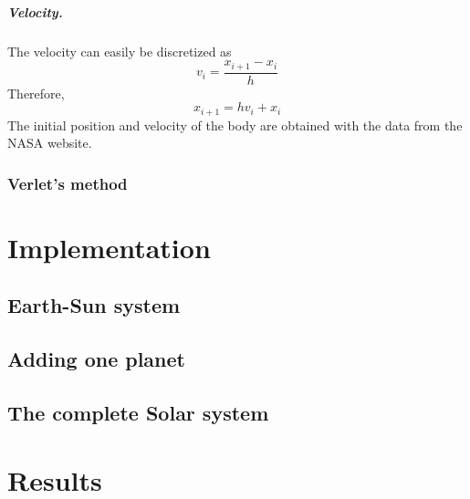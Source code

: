 \documentclass[a4paper, twoside, 11pt]{report}
\theoremstyle{theorem}
\theoremstyle{remark}
\theoremstyle{exemple}
\begin{document}
             \paragraph{Velocity.}The velocity can easily be discretized as
                \begin{equation*}
                      v_i = \frac{x_{i+1}-x_i}{h}
                  \end{equation*}
             Therefore,
                 \begin{equation*}
                    x_{i+1} = hv_i + x_i
                    \tag{9}
                \end{equation*}   
            The initial position and velocity of the body are obtained with the data from the NASA website.
        \subsection{Verlet's method}

\chapter{Implementation}

    \section{Earth-Sun system}
        \paragraph{}
    
    \section{Adding one planet}
    
    
    \section{The complete Solar system}
    
    

\chapter{Results}

    \section{}
    
\end{document}
